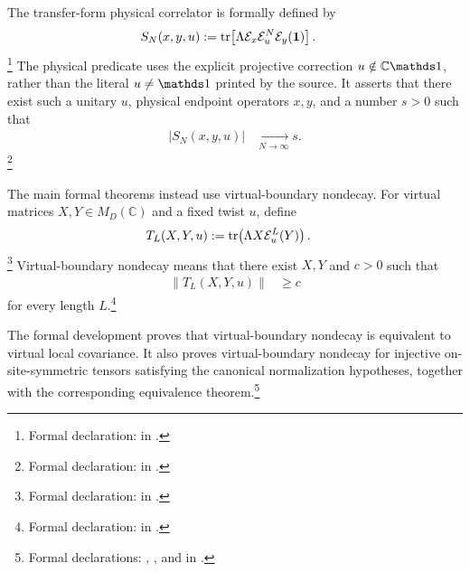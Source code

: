 \documentclass[11pt]{article}
\begin{document}
The transfer-form physical correlator is formally defined by
\begin{align}
    S_N(x,y,u)
     & :=
    \operatorname{tr}\!\left[\Lambda
        \mathcal{E}_x
        \mathcal{E}_u^N
        \mathcal{E}_y(\mathbf{1})\right].
    \label{eq:pgwsvc08_string_order_virtual_boundary_formal_physical_parameter}
\end{align}
\footnote{Formal declaration:
     in
    .}
The physical predicate uses the explicit projective correction
$u\notin\C\Id$, rather than the literal $u\ne\Id$ printed by the source.
It asserts that there exist such a unitary $u$, physical endpoint operators
$x,y$, and a number $s>0$ such that
\begin{align}
    \left|S_N(x,y,u)\right|
     & \xrightarrow[N\to\infty]{}s.
    \label{eq:pgwsvc08_string_order_virtual_boundary_formal_positive_limit}
\end{align}
\footnote{Formal declaration:
     in
    .}

The main formal theorems instead use virtual-boundary nondecay. For virtual
matrices $X,Y\in M_D(\mathbb{C})$ and a fixed twist $u$, define
\begin{align}
    T_L(X,Y,u)
     & :=
    \operatorname{tr}\!\left(\Lambda X\mathcal{E}_u^L(Y)\right).
    \label{eq:pgwsvc08_string_order_virtual_boundary_virtual_functional}
\end{align}
\footnote{Formal declaration:
     in
    .}
Virtual-boundary nondecay means that there exist $X,Y$ and $c>0$ such that
\begin{align}
    \left\lVert T_L(X,Y,u)\right\rVert
     & \geq c
    \label{eq:pgwsvc08_string_order_virtual_boundary_uniform_nondecay}
\end{align}
for every length $L$.\footnote{Formal declaration:
     in
    .}

The formal development proves that virtual-boundary nondecay is equivalent to
virtual local covariance. It also proves virtual-boundary nondecay for
injective on-site-symmetric tensors satisfying the canonical normalization
hypotheses, together with the corresponding equivalence theorem.\footnote{
    Formal declarations:
    ,
    , and
     in
    .}
\end{document}
